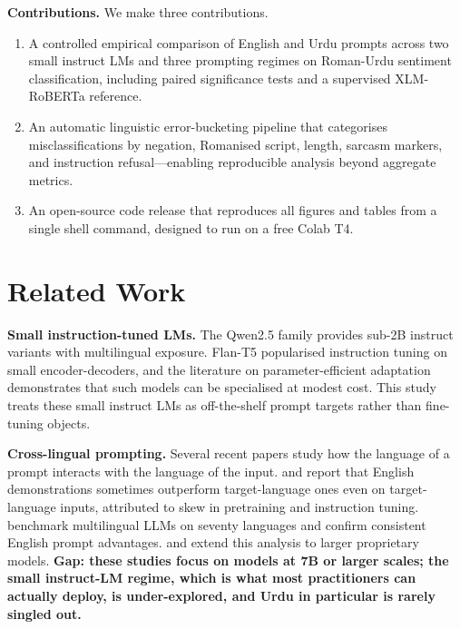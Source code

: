 \documentclass[conference]{IEEEtran}
\begin{document}
\textbf{Contributions.} We make three contributions.
\begin{enumerate}
  \item A controlled empirical comparison of English and Urdu prompts across
  two small instruct LMs and three prompting regimes on Roman-Urdu sentiment
  classification, including paired significance tests and a supervised
  XLM-RoBERTa \cite{conneau2020unsupervised} reference.
  \item An automatic linguistic error-bucketing pipeline that categorises
  misclassifications by negation, Romanised script, length,
  sarcasm markers, and instruction refusal---enabling reproducible analysis
  beyond aggregate metrics.
  \item An open-source code release that reproduces all figures and tables
  from a single shell command, designed to run on a free Colab T4.
\end{enumerate}

\section{Related Work}

\textbf{Small instruction-tuned LMs.}
The Qwen2.5 \cite{qwen25} family provides sub-2B instruct variants with
multilingual exposure. Flan-T5 \cite{chung2024scaling} popularised
instruction tuning on small encoder-decoders, and the literature on
parameter-efficient adaptation \cite{hu2022lora,peft2023} demonstrates
that such models can be specialised at modest cost. This study treats
these small instruct LMs as off-the-shelf prompt targets rather than
fine-tuning objects.

\textbf{Cross-lingual prompting.}
Several recent papers study how the language of a prompt interacts with
the language of the input. \cite{lin2022few} and \cite{shi2022language}
report that English demonstrations sometimes outperform target-language
ones even on target-language inputs, attributed to skew in pretraining
and instruction tuning. \cite{ahuja2023mega} benchmark multilingual LLMs
on seventy languages and confirm consistent English prompt advantages.
\cite{lai2023chatgpt} and \cite{asai2023buffet} extend this analysis to
larger proprietary models. \textbf{Gap: these studies focus on models at
7B or larger scales; the small instruct-LM regime, which is what most
practitioners can actually deploy, is under-explored, and Urdu in particular
is rarely singled out.}
\end{document}
